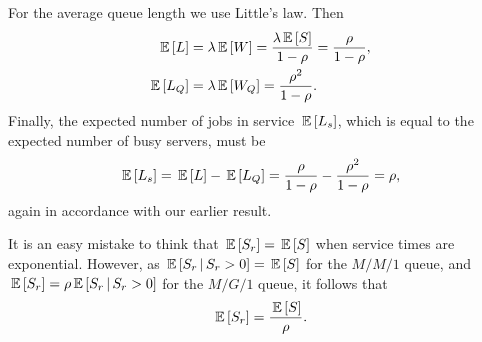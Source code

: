 For the average queue length we use Little's law. Then
\begin{equation*}
  \begin{split}
\,\mathbb{E}\left[L\right] &= \lambda \,\mathbb{E}\left[W\right] = \frac{\lambda \,\mathbb{E}\left[S\right]}{1-\rho} = \frac\rho{1-\rho}, \\
  \,\mathbb{E}\left[L_Q\right] &= \lambda \,\mathbb{E}\left[W_Q\right] = \frac{\rho^2}{1-\rho}.
      \end{split}
\end{equation*}
Finally, the expected number of jobs in service $\,\mathbb{E}\left[L_s\right]$, which is
equal to the expected number of busy servers, must be
\begin{equation*}
  \,\mathbb{E}\left[L_s\right] = \,\mathbb{E}\left[L\right] - \,\mathbb{E}\left[L_Q\right] = \frac{\rho}{1-\rho} - \frac{\rho^2}{1-\rho} = \rho, 
\end{equation*}
again in accordance with our earlier result.

\begin{remark}
  It is an easy mistake to think that $\,\mathbb{E}\left[S_r\right] = \,\mathbb{E}\left[S\right]$ when service
  times are exponential. However, as $\,\mathbb{E}\left[S_r \,\middle|\, S_r>0\right] = \,\mathbb{E}\left[S\right]$ for
  the $M/M/1$ queue, and $\,\mathbb{E}\left[S_r\right] = \rho \,\mathbb{E}\left[S_r \,\middle|\, S_r>0\right]$ for the
  $M/G/1$ queue, it follows that
  \begin{equation*}
 \,\mathbb{E}\left[S_r\right] = \frac{\,\mathbb{E}\left[S\right]}{\rho}.
  \end{equation*}
\end{remark}

